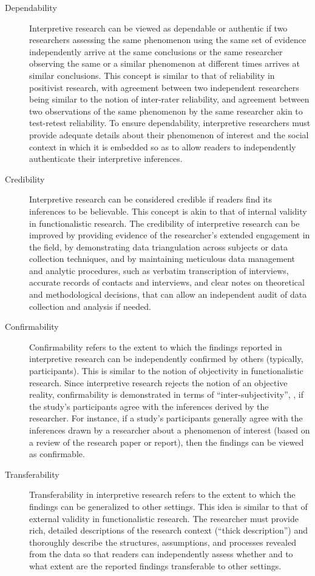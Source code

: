 \begin{description}
	\item[Dependability] Interpretive research can be viewed as dependable or authentic if two researchers assessing the same phenomenon using the same set of evidence independently arrive at the same conclusions or the same researcher observing the same or a similar phenomenon at different times arrives at similar conclusions. This concept is similar to that of reliability in positivist research, with agreement between two independent researchers being similar to the notion of inter-rater reliability, and agreement between two observations of the same phenomenon by the same researcher akin to test-retest reliability. To ensure dependability, interpretive researchers must provide adequate details about their phenomenon of interest and the social context in which it is embedded so as to allow readers to independently authenticate their interpretive inferences.

	\item[Credibility] Interpretive research can be considered credible if readers find its inferences to be believable. This concept is akin to that of internal validity in functionalistic research. The credibility of interpretive research can be improved by providing evidence of the researcher's extended engagement in the field, by demonstrating data triangulation across subjects or data collection techniques, and by maintaining meticulous data management and analytic procedures, such as verbatim transcription of interviews, accurate records of contacts and interviews, and clear notes on theoretical and methodological decisions, that can allow an independent audit of data collection and analysis if needed.

	\item[Confirmability] Confirmability refers to the extent to which the findings reported in interpretive research can be independently confirmed by others (typically, participants). This is similar to the notion of objectivity in functionalistic research. Since interpretive research rejects the notion of an objective reality, confirmability is demonstrated in terms of ``inter-subjectivity'', \ie, if the study's participants agree with the inferences derived by the researcher. For instance, if a study's participants generally agree with the inferences drawn by a researcher about a phenomenon of interest (based on a review of the research paper or report), then the findings can be viewed as confirmable.

	\item[Transferability] Transferability in interpretive research refers to the extent to which the findings can be generalized to other settings. This idea is similar to that of external validity in functionalistic research. The researcher must provide rich, detailed descriptions of the research context (``thick description'') and thoroughly describe the structures, assumptions, and processes revealed from the data so that readers can independently assess whether and to what extent are the reported findings transferable to other settings.
	
\end{description}

